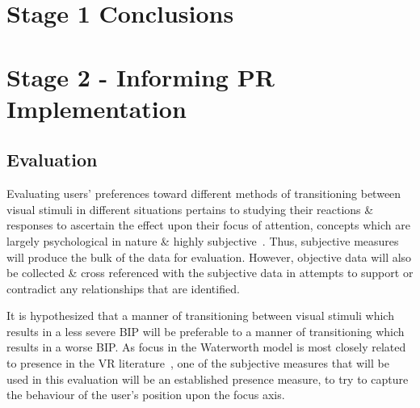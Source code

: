 \section{Stage 1 Conclusions}




\clearpage

\section{Stage 2 - Informing PR Implementation}

\subsection{Evaluation}

Evaluating users' preferences toward different methods of transitioning between visual stimuli in different situations pertains to studying their reactions \& responses to ascertain the effect upon their focus of attention, concepts which are largely psychological in nature \& highly subjective~\cite{Ijsselsteijn2001}. Thus, subjective measures will produce the bulk of the data for evaluation. However, objective data will also be collected \& cross referenced with the subjective data in attempts to support or contradict any relationships that are identified.

It is hypothesized that a manner of transitioning between visual stimuli which results in a less severe BIP will be preferable to a manner of transitioning which results in a worse BIP. As focus in the Waterworth model is most closely related to presence in the VR literature~\cite{Waterworth2001}, one of the subjective measures that will be used in this evaluation will be an established presence measure, to try to capture the behaviour of the user's position upon the focus axis.

